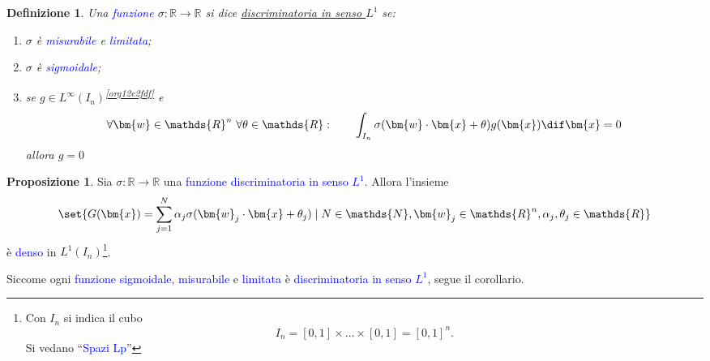 \documentclass[10pt]{book}
\newcommand{\1}{\mathds{1}}
\newcommand{\R}{\mathds{R}}
\newcommand{\N}{\mathds{N}}
\theoremstyle{definition}%
\newtheorem{prop}[thm]{Proposizione}
\theoremstyle{plain}
\newtheorem{definizione}[thm]{Definizione}
\theoremstyle{remark}
\renewcommand{\href}[2]{\textcolor{blue}{#2}}
\begin{document}
\begin{definizione}
Una \href{../../../../../org/roam/20250202170607-classe_relazione_binaria.org}{funzione} \(\sigma:\R\to \R\) si dice \uline{discriminatoria in senso \(L^{1}\)} se:
\begin{enumerate}
\item \(\sigma\) è \href{../../../../../org/roam/20250704104947-funzione_misurabile.org}{misurabile} e \href{../../../../../org/roam/20250704145518-funzione_limitata.org}{limitata};
\item \(\sigma\) è \href{../../../../../org/roam/20250625110110-funzione_sigmoidale.org}{sigmoidale};
\item se \(g \in L^{\infty}(I_{n})\)\textsuperscript{\ref{org12e2fdf}} e
\begin{equation*}
 \forall \bm{w} \in \R^{n}\ \forall \theta \in \R:\qquad\int_{I_{n}} \sigma(\bm{w}\cdot\bm{x} + \theta)g(\bm{x})\dif\bm{x} = 0
\end{equation*}
allora \(g=0\)
\end{enumerate}
\label{def9.3.16}
\end{definizione}

\begin{prop}
Sia \(\sigma:\R\to\R\) una \href{../../../../../org/roam/20250202170607-classe_relazione_binaria.org}{funzione} \href{../../../../../org/roam/20250625105528-funzione_discriminatoria_per_una_misura_di_baire_sul_cubo_unitario.org}{discriminatoria in senso \(L^{1}\)}. Allora l'insieme
\begin{equation*}
\set{
G(\bm{x}) = \sum_{j=1}^{N}\alpha_{j}\sigma(\bm{w}_{j}\cdot \bm{x} + \theta_{j})\mid N \in \N, \bm{w}_{j} \in \R^{n}, \alpha_{j},\theta_{j} \in \R
}
\end{equation*}
è \href{../../../../../org/roam/20250301193045-sottoinsieme_denso.org}{denso} in \(L^{1}(I_{n})\)\footnote{Con \(I_{n}\) si indica il cubo
\begin{equation*}
I_{n} = [0,1]\times \dots \times [0,1] = [0,1]^{n}.
\end{equation*}
Si vedano ``\href{../../../../../org/roam/20250624162220-spazi_lp.org}{Spazi Lp}''\label{orgcdb408e}}.
\label{prop9.3.17}
\end{prop}

Siccome ogni \href{../../../../../org/roam/20250202170607-classe_relazione_binaria.org}{funzione} \href{../../../../../org/roam/20250625110110-funzione_sigmoidale.org}{sigmoidale}, \href{../../../../../org/roam/20250704104947-funzione_misurabile.org}{misurabile} e \href{../../../../../org/roam/20250704145518-funzione_limitata.org}{limitata} è \href{../../../../../org/roam/20250625105528-funzione_discriminatoria_per_una_misura_di_baire_sul_cubo_unitario.org}{discriminatoria in senso \(L^{1}\)}, segue il corollario.
\end{document}
